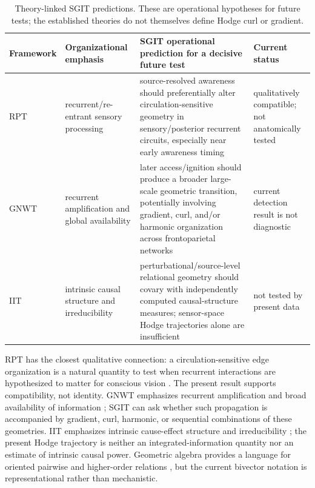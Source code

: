 \documentclass[12pt]{article}
\begin{document}
\begin{table}[t]
\centering\small
\caption{Theory-linked SGIT predictions. These are operational hypotheses for future tests; the established theories do not themselves define Hodge curl or gradient.}
\label{tab:theorypredictions}
\begin{tabularx}{\textwidth}{@{}p{}p{}Xp{}@{}}
\toprule
Framework & Organizational emphasis & SGIT operational prediction for a decisive future test & Current status\\
\midrule
RPT & recurrent/re-entrant sensory processing & source-resolved awareness should preferentially alter circulation-sensitive geometry in sensory/posterior recurrent circuits, especially near early awareness timing & qualitatively compatible; not anatomically tested\\
GNWT & recurrent amplification and global availability & later access/ignition should produce a broader large-scale geometric transition, potentially involving gradient, curl, and/or harmonic organization across frontoparietal networks & current detection result is not diagnostic\\
IIT & intrinsic causal structure and irreducibility & perturbational/source-level relational geometry should covary with independently computed causal-structure measures; sensor-space Hodge trajectories alone are insufficient & not tested by present data\\
\bottomrule
\end{tabularx}
\end{table}

RPT has the closest qualitative connection: a circulation-sensitive edge organization is a natural quantity to test when recurrent interactions are hypothesized to matter for conscious vision \citep{Lamme2006}. The present result supports compatibility, not identity. GNWT emphasizes recurrent amplification and broad availability of information \citep{DehaeneChangeux2011}; SGIT can ask whether such propagation is accompanied by gradient, curl, harmonic, or sequential combinations of these geometries. IIT emphasizes intrinsic cause-effect structure and irreducibility \citep{Albantakis2023}; the present Hodge trajectory is neither an integrated-information quantity nor an estimate of intrinsic causal power. Geometric algebra provides a language for oriented pairwise and higher-order relations \citep{HestenesSobczyk1984,Lavor2018,Svitek2024GA}, but the current bivector notation is representational rather than mechanistic.
\end{document}
